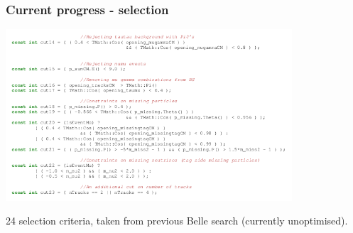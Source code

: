 \documentclass[xcolor=table]{beamer}
\begin{document}

\begin{frame}
\frametitle{Current progress - selection}


\begin{center}
\includegraphics[width=0.8\textwidth]{images/selection-code2.png}
\end{center}

24 selection criteria, taken from previous Belle search (currently unoptimised).


\end{frame}

\end{document}
